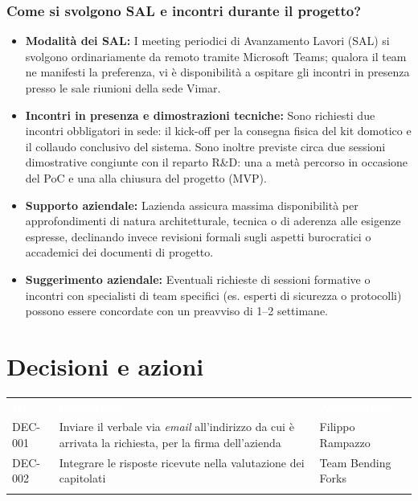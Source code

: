 \documentclass[12pt,a4paper]{article}
\newcommand{\tightlist}{\setlength{\itemsep}{1pt}\setlength{\parskip}{0pt}}
\begin{document}
\hypertarget{come-si-svolgono-sal-e-incontri-durante-il-progetto}{%
\subsubsection{\texorpdfstring{Come si svolgono SAL e incontri durante il progetto?}{Come si svolgono SAL e incontri durante il progetto?}}}

\begin{itemize}
\tightlist
\item \textbf{Modalità dei SAL:} I meeting periodici di Avanzamento Lavori (SAL) si svolgono ordinariamente da remoto tramite Microsoft Teams; qualora il team ne manifesti la preferenza, vi è disponibilità a ospitare gli incontri in presenza presso le sale riunioni della sede Vimar.
\item \textbf{Incontri in presenza e dimostrazioni tecniche:} Sono richiesti due incontri obbligatori in sede: il kick-off per la consegna fisica del kit domotico e il collaudo conclusivo del sistema. Sono inoltre previste circa due sessioni dimostrative congiunte con il reparto R\&D: una a metà percorso in occasione del PoC e una alla chiusura del progetto (MVP).
\item \textbf{Supporto aziendale:} L\textquotesingle azienda assicura massima disponibilità per approfondimenti di natura architetturale, tecnica o di aderenza alle esigenze espresse, declinando invece revisioni formali sugli aspetti burocratici o accademici dei documenti di progetto.
\item \textbf{Suggerimento aziendale:} Eventuali richieste di sessioni formative o incontri con specialisti di team specifici (es. esperti di sicurezza o protocolli) possono essere concordate con un preavviso di 1–2 settimane.
\end{itemize}

\hypertarget{decisioni-e-azioni}{%
\section{Decisioni e azioni}}

\begin{center}
\begin{tabularx}{\linewidth}{>{\hsize=0.511\hsize\raggedright\arraybackslash}X>{\hsize=1.675\hsize\raggedright\arraybackslash}X>{\hsize=0.814\hsize\raggedright\arraybackslash}X}
\rowcolor{bfblue}\textcolor{white}{\textbf{ID}} & \textcolor{white}{\textbf{Descrizione}} & \textcolor{white}{\textbf{Assegnatario}} \\
DEC-001 & Inviare il verbale via \emph{email} all'indirizzo da cui è arrivata la richiesta, per la firma dell'azienda & Filippo Rampazzo \\ \arrayrulecolor{bfline}\hline
DEC-002 & Integrare le risposte ricevute nella valutazione dei capitolati & Team Bending Forks\\ \arrayrulecolor{bfline}\hline
\end{tabularx}
\end{center}
\end{document}
